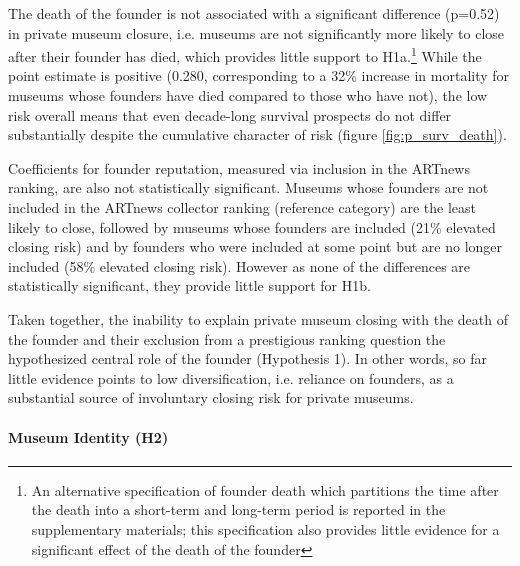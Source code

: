 \documentclass[12pt]{article}
\begin{document}
The death of the founder is not associated with a significant difference (p=0.52) in private museum closure, i.e. museums are not significantly more likely to close after their founder has died, which provides little support to H1a.\footnote{An alternative specification of founder death which partitions the time after the death into a short-term and long-term period is reported in the supplementary materials; this specification also provides little evidence for a significant effect of the death of the founder}
While the point estimate is positive (0.280, corresponding to a 32\% increase in mortality for museums whose founders have died compared to those who have not), the low risk overall means that even decade-long survival prospects do not differ substantially despite the cumulative character of risk (figure \ref{fig:p_surv_death}).



Coefficients for founder reputation, measured via inclusion in the ARTnews ranking, are also not statistically significant.
Museums whose founders are not included in the ARTnews collector ranking (reference category) are the least likely to close, followed by museums whose founders are included (21\% elevated closing risk) and by founders who were included at some point but are no longer included (58\% elevated closing risk).
However as none of the differences are statistically significant, they provide little support for H1b.




Taken together, the inability to explain private museum closing with the death of the founder and their exclusion from a prestigious ranking question the hypothesized central role of the founder (Hypothesis 1).
In other words, so far little evidence points to low diversification, i.e. reliance on founders, as a substantial source of involuntary closing risk for private museums.
\paragraph*{Museum Identity (H2)}
\end{document}
